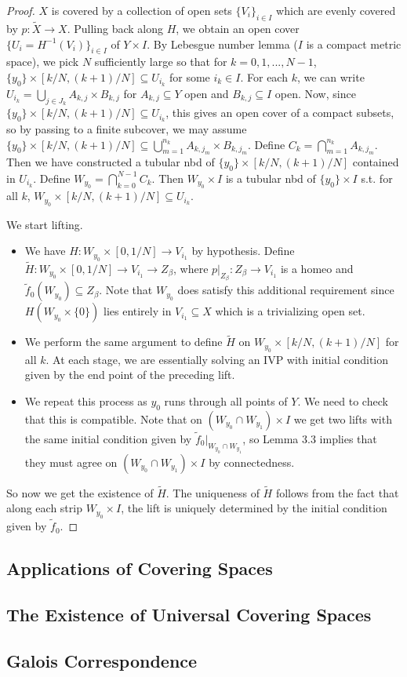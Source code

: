 \documentclass{article}
\theoremstyle{definition}
\theoremstyle{remark}
\theoremstyle{plain}
\begin{document}
\begin{proof}
    $X$ is covered by a collection of open sets $\{V_{i}\}_{i\in I}$ which are evenly covered by $p:\tilde X\to X$. Pulling back along $H$, we obtain an open cover $\{U_i=H^{-1}(V_i)\}_{i\in I}$ of $Y\times I$. By Lebesgue number lemma ($I$ is a compact metric space), we pick $N$ sufficiently large so that for $k=0,1,...,N-1$, $\{y_0\}\times[k/N,(k+1)/N]\subseteq U_{i_k}$ for some $i_k\in I$. For each $k$, we can write $U_{i_k}=\bigcup_{j\in J_k}A_{k,j}\times B_{k,j}$ for $A_{k,j}\subseteq Y$ open and $B_{k,j}\subseteq I$ open. Now, since $\{y_0\}\times[k/N,(k+1)/N]\subseteq U_{i_k}$, this gives an open cover of a compact subsets, so by passing to a finite subcover, we may assume $\{y_0\}\times[k/N,(k+1)/N]\subseteq\bigcup_{m=1}^{n_k}A_{k,j_m}\times B_{k,j_m}$. Define $C_k=\bigcap_{m=1}^{n_k}A_{k,j_m}$. Then we have constructed a tubular nbd of $\{y_0\}\times [k/N,(k+1)/N]$ contained in $U_{i_k}$. Define $W_{y_0}=\bigcap_{k=0}^{N-1}C_k$. Then $W_{y_0}\times I$ is a tubular nbd of $\{y_0\}\times I$ s.t. for all $k$, $W_{y_0}\times [k/N,(k+1)/N]\subseteq U_{i_k}$. 

    We start lifting. 
    \begin{itemize}
        \item We have $H:W_{y_0}\times[0,1/N]\to V_{i_1}$ by hypothesis. Define $\tilde H:W_{y_0}\times[0,1/N]\to V_{i_1}\to Z_\beta$, where $p|_{Z_\beta}:Z_\beta\to V_{i_1}$ is a homeo and $\tilde f_0(W_{y_0})\subseteq Z_\beta$. Note that $W_{y_0}$ does satisfy this additional requirement since $H(W_{y_0}\times\{0\})$ lies entirely in $V_{i_1}\subseteq X$ which is a trivializing open set.
        \item We perform the same argument to define $\tilde H$ on $W_{y_0}\times [k/N,(k+1)/N]$ for all $k$. At each stage, we are essentially solving an IVP with initial condition given by the end point of the preceding lift.
        \item We repeat this process as $y_0$ runs through all points of $Y$. We need to check that this is compatible. Note that on $(W_{y_0}\cap W_{y_1})\times I$ we get two lifts with the same initial condition given by $\tilde f_0|_{W_{y_0}\cap W_{y_1}}$, so Lemma 3.3 implies that they must agree on $(W_{y_0}\cap W_{y_1})\times I$ by connectedness.
    \end{itemize}
    So now we get the existence of $\tilde H$. The uniqueness of $\tilde H$ follows from the fact that along each strip $W_{y_0}\times I$, the lift is uniquely determined by the initial condition given by $\tilde f_0$.
\end{proof}
\subsection{Applications of Covering Spaces}

\subsection{The Existence of Universal Covering Spaces}
\subsection{Galois Correspondence}
\end{document}
